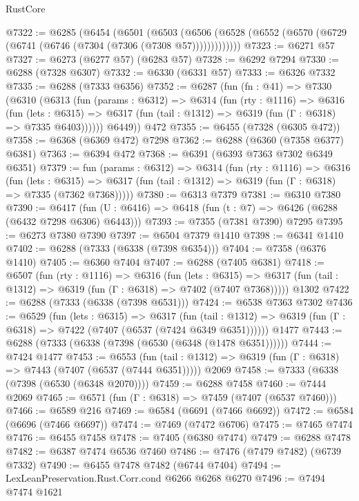 \begin{lexlean}{RustCore}
\begin{coremodule}
@7322 := @6285
    (@6454
      (@6501
        (@6503
          (@6506 (@6528 (@6552 (@6570 (@6729 (@6741 (@6746 (@7304 (@7306 (@7308 @57)))))))))))))
@7323 := @6271 @57
@7327 := @6273 (@6277 @57) (@6283 @57)
@7328 := @6292 @7294
@7330 := @6288 (@7328 @6307)
@7332 := @6330 (@6331 @57)
@7333 := @6326 @7332
@7335 := @6288 (@7333 @6356)
@7352 := @6287
    (fun (fn : @41) =>
    @7330
      (@6310
        (@6313
          (fun (params : @6312) =>
          @6314
            (fun (rty : @1116) =>
            @6316
              (fun (lets : @6315) =>
              @6317 (fun (tail : @1312) => @6319 (fun (Γ : @6318) => @7335 @6403))))))
        @6449))
    @472
@7355 := @6455 (@7328 (@6305 @472))
@7358 := @6368 (@6369 @472) @7298
@7362 := @6288 (@6360 (@7358 @6377) @6381)
@7363 := @6394 @472
@7368 := @6391 (@6393 @7363 @7302 @6349 @6351)
@7379 := fun (params : @6312) =>
  @6314
    (fun (rty : @1116) =>
    @6316
      (fun (lets : @6315) =>
      @6317 (fun (tail : @1312) => @6319 (fun (Γ : @6318) => @7335 (@7362 @7368)))))
@7380 := @6313 @7379
@7381 := @6310 @7380
@7390 := @6417 (fun (U : @6416) => @6418 (fun (t : @7) => @6426 (@6288 (@6432 @7298 @6306) @6443)))
@7393 := @7355 (@7381 @7390) @7295
@7395 := @6273 @7380 @7390
@7397 := @6504 @7379 @1410
@7398 := @6341 @1410
@7402 := @6288 (@7333 (@6338 (@7398 @6354)))
@7404 := @7358 (@6376 @1410)
@7405 := @6360 @7404
@7407 := @6288 (@7405 @6381)
@7418 := @6507
    (fun (rty : @1116) =>
    @6316
      (fun (lets : @6315) =>
      @6317 (fun (tail : @1312) => @6319 (fun (Γ : @6318) => @7402 (@7407 @7368)))))
    @1302
@7422 := @6288 (@7333 (@6338 (@7398 @6531)))
@7424 := @6538 @7363 @7302
@7436 := @6529
    (fun (lets : @6315) =>
    @6317
      (fun (tail : @1312) => @6319 (fun (Γ : @6318) => @7422 (@7407 (@6537 (@7424 @6349 @6351))))))
    @1477
@7443 := @6288 (@7333 (@6338 (@7398 (@6530 (@6348 (@1478 @6351))))))
@7444 := @7424 @1477
@7453 := @6553
    (fun (tail : @1312) => @6319 (fun (Γ : @6318) => @7443 (@7407 (@6537 (@7444 @6351)))))
    @2069
@7458 := @7333 (@6338 (@7398 (@6530 (@6348 @2070))))
@7459 := @6288 @7458
@7460 := @7444 @2069
@7465 := @6571 (fun (Γ : @6318) => @7459 (@7407 (@6537 @7460)))
@7466 := @6589 @216
@7469 := @6584 (@6691 (@7466 @6692))
@7472 := @6584 (@6696 (@7466 @6697))
@7474 := @7469 (@7472 @6706)
@7475 := @7465 @7474
@7476 := @6455 @7458
@7478 := @7405 (@6380 @7474)
@7479 := @6288 @7478
@7482 := @6387 @7474 @6536 @7460
@7486 := @7476 (@7479 @7482) (@6739 @7332)
@7490 := @6455 @7478 @7482 (@6744 @7404)
@7494 := LexLeanPreservation.Rust.Corr.cond @6266 @6268 @6270
@7496 := @7494 @7474 @1621

\end{coremodule}
\end{lexlean}
